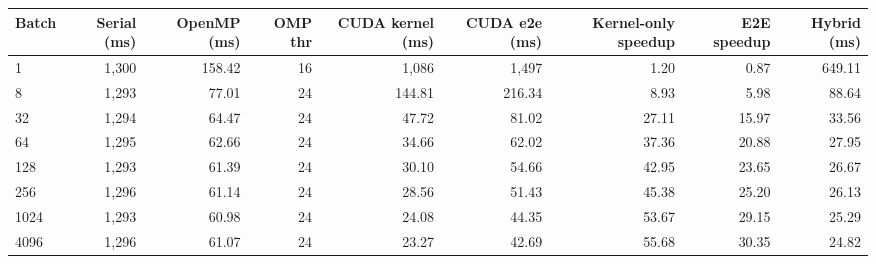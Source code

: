 \begin{tabular}{lrrrrrrrr}
\toprule
Batch & Serial (ms) & OpenMP (ms) & OMP thr & CUDA kernel (ms) & CUDA e2e (ms) & Kernel-only speedup & E2E speedup & Hybrid (ms) \\
\midrule
1 & 1,300 & 158.42 & 16 & 1,086 & 1,497 & 1.20 & 0.87 & 649.11 \\
8 & 1,293 & 77.01 & 24 & 144.81 & 216.34 & 8.93 & 5.98 & 88.64 \\
32 & 1,294 & 64.47 & 24 & 47.72 & 81.02 & 27.11 & 15.97 & 33.56 \\
64 & 1,295 & 62.66 & 24 & 34.66 & 62.02 & 37.36 & 20.88 & 27.95 \\
128 & 1,293 & 61.39 & 24 & 30.10 & 54.66 & 42.95 & 23.65 & 26.67 \\
256 & 1,296 & 61.14 & 24 & 28.56 & 51.43 & 45.38 & 25.20 & 26.13 \\
1024 & 1,293 & 60.98 & 24 & 24.08 & 44.35 & 53.67 & 29.15 & 25.29 \\
4096 & 1,296 & 61.07 & 24 & 23.27 & 42.69 & 55.68 & 30.35 & 24.82 \\
\bottomrule
\end{tabular}
